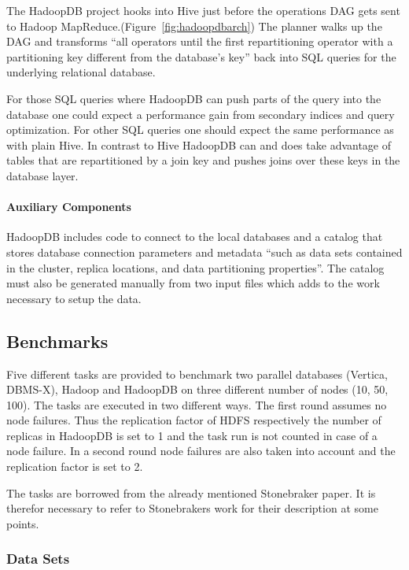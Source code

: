 \documentclass[12pt,a4paper]{scrartcl}		%
\begin{document}
The HadoopDB project hooks into Hive just before the operations DAG gets sent to Hadoop MapReduce.(Figure~\ref{fig:hadoopdbarch}) The planner walks up the DAG and transforms ``all operators until the first repartitioning operator with a partitioning key different from the database's key'' back into SQL queries for the underlying relational database. 

For those SQL queries where HadoopDB can push parts of the query into the database one could expect a performance gain from secondary indices and query optimization. For other SQL queries one should expect the same performance as with plain Hive. In contrast to Hive HadoopDB can and does take advantage of tables that are repartitioned by a join key and pushes joins over these keys in the database layer.

\paragraph{Auxiliary Components}
HadoopDB includes code to connect to the local databases and a catalog that stores database connection parameters and metadata ``such as data sets contained in the cluster, replica locations, and data partitioning properties''. The catalog must also be generated manually from two input files which adds to the work necessary to setup the data.

\subsection{Benchmarks}

Five different tasks are provided to benchmark two parallel databases (Vertica, DBMS-X), Hadoop and HadoopDB on three different number of nodes (10, 50, 100). The tasks are executed in two different ways. The first round assumes no node failures. Thus the replication factor of HDFS respectively the number of replicas in HadoopDB is set to 1 and the task run is not counted in case of a node failure. In a second round node failures are also taken into account and the replication factor is set to 2.

The tasks are borrowed from the already mentioned Stonebraker paper\cite{Pavlo09}. It is therefor necessary to refer to Stonebrakers work for their description at some points.

\subsubsection{Data Sets}
\end{document}

